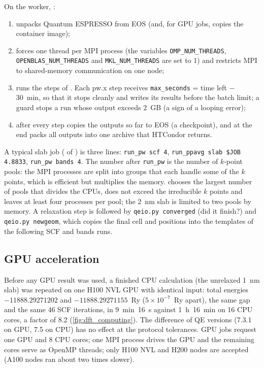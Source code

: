 On the worker, :
\begin{enumerate}
\item unpacks Quantum ESPRESSO from EOS (and, for GPU jobs, copies the container image);
\item forces one thread per MPI process (the variables \texttt{OMP\_NUM\_THREADS},
\texttt{OPENBLAS\_NUM\_THREADS} and \texttt{MKL\_NUM\_THREADS} are set to 1) and restricts MPI to shared-memory communication on one node;
\item runs the steps of . Each pw.x step receives \texttt{max\_seconds} = time left $-$ 30~min, so that
it stops cleanly and writes its results before the batch limit; a guard stops a run whose output exceeds 2~GB (a sign
of a looping error);
\item after every step copies the outputs so far to EOS (a checkpoint), and at the end packs all outputs into one
archive that HTCondor returns.
\end{enumerate}
A typical slab job ( of ) is three lines: \texttt{run\_pw scf 4}, \texttt{run\_ppavg
slab \$JOB 4.8833}, \texttt{run\_pw bands 4}. The number after \texttt{run\_pw} is the number of $k$-point pools: the
MPI processes are split into groups that each handle some of the $k$ points, which is efficient but multiplies the
memory.  chooses the largest number of pools that divides the CPUs, does not exceed the irreducible $k$
points and leaves at least four processes per pool; the 2~nm slab is limited to two pools by memory. A relaxation step
is followed by \texttt{qeio.py converged} (did it finish?) and \texttt{qeio.py newgeom}, which copies the final cell and
positions into the templates of the following SCF and bands runs.

\subsection{GPU acceleration}
\label{sec:dft-gpu}

Before any GPU result was used, a finished CPU calculation (the unrelaxed 1~nm slab) was repeated on one H100 NVL GPU
with identical input: total energies $-11888.29271202$ and $-11888.29271155$~Ry ($5\times10^{-7}$~Ry apart), the same
gap and the same 46 SCF iterations, in 9~min~16~s against 1~h~16~min on 16 CPU cores, a factor of 8.2
(\cref{fig:dft_computing}). The difference of QE versions (7.3.1 on GPU, 7.5 on CPU) has no effect at the protocol
tolerances. GPU jobs request one GPU and 8 CPU cores; one MPI process drives the GPU and the remaining cores serve as
OpenMP threads; only H100 NVL and H200 nodes are accepted (A100 nodes ran about two times slower).


